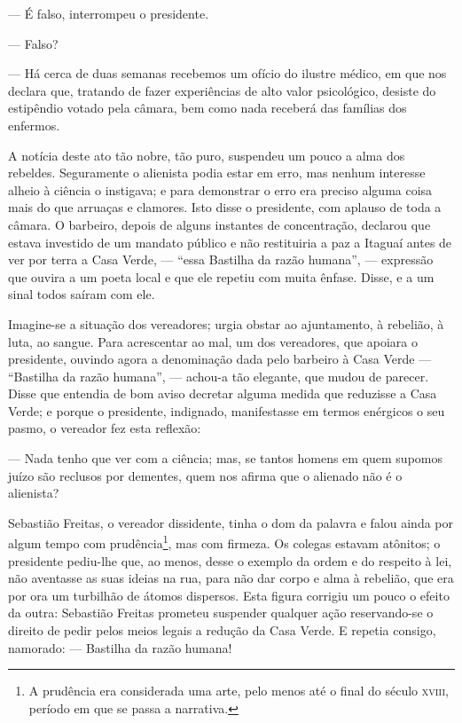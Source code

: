 --- É falso, interrompeu o presidente.

--- Falso?

--- Há cerca de duas semanas recebemos um ofício do ilustre médico, em
que nos declara que, tratando de fazer experiências de alto valor
psicológico, desiste do estipêndio votado pela câmara, bem como nada
receberá das famílias dos enfermos.

A notícia deste ato tão nobre, tão puro, suspendeu um pouco a alma dos
rebeldes. Seguramente o alienista podia estar em erro, mas nenhum
interesse alheio à ciência o instigava; e para demonstrar o erro era
preciso alguma coisa mais do que arruaças e clamores. Isto disse o
presidente, com aplauso de toda a câmara. O barbeiro, depois de alguns
instantes de concentração, declarou que estava investido de um mandato
público e não restituiria a paz a Itaguaí antes de ver por terra a Casa
Verde, --- ``essa Bastilha da razão humana'', --- expressão que ouvira a
um poeta local e que ele repetiu com muita ênfase. Disse, e a um sinal
todos saíram com ele.

Imagine-se a situação dos vereadores; urgia obstar ao ajuntamento, à
rebelião, à luta, ao sangue. Para acrescentar ao mal, um dos vereadores,
que apoiara o presidente, ouvindo agora a denominação dada pelo barbeiro
à Casa Verde --- ``Bastilha da razão humana'', --- achou-a tão elegante,
que mudou de parecer. Disse que entendia de bom aviso decretar alguma
medida que reduzisse a Casa Verde; e porque o presidente, indignado,
manifestasse em termos enérgicos o seu pasmo, o vereador fez esta
reflexão:

--- Nada tenho que ver com a ciência; mas, se tantos homens em quem
supomos juízo são reclusos por dementes, quem nos afirma que o alienado
não é o alienista?

Sebastião Freitas, o vereador dissidente, tinha o dom da palavra e falou
ainda por algum tempo com prudência\footnote{A prudência era considerada
  uma arte, pelo menos até o final do século \textsc{xviii}, período em que se
  passa a narrativa.}, mas com firmeza. Os colegas estavam atônitos; o
presidente pediu-lhe que, ao menos, desse o exemplo da ordem e do
respeito à lei, não aventasse as suas ideias na rua, para não dar corpo
e alma à rebelião, que era por ora um turbilhão de átomos dispersos.
Esta figura corrigiu um pouco o efeito da outra: Sebastião Freitas
prometeu suspender qualquer ação reservando-se o direito de pedir pelos
meios legais a redução da Casa Verde. E repetia consigo, namorado: ---
Bastilha da razão humana!


